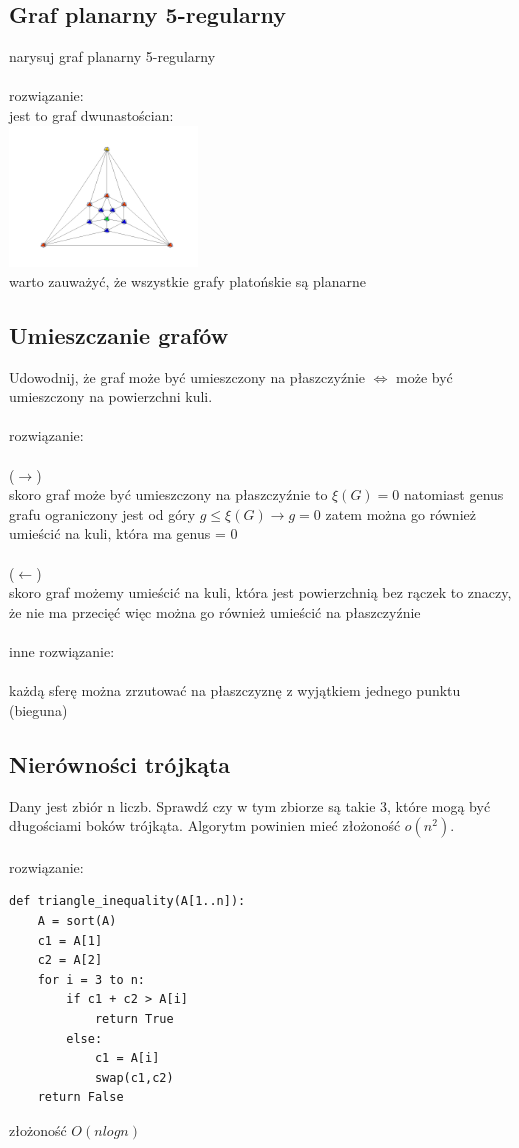 \documentclass{article}
\begin{document}
\subsection*{Graf planarny 5-regularny}
narysuj graf planarny 5-regularny \\\\ rozwiązanie: \\
jest to graf dwunastościan: \\
\includegraphics[width=5cm]{icosahedron} \\
warto zauważyć, że wszystkie grafy platońskie są planarne

\subsection*{Umieszczanie grafów}
Udowodnij, że graf może być umieszczony na płaszczyźnie $\iff$ może być umieszczony na powierzchni kuli. \\\\rozwiązanie:\\\\
($\longrightarrow$)\\
skoro graf może być umieszczony na płaszczyźnie to $\xi(G) = 0$ natomiast genus grafu ograniczony jest od góry $g \leq \xi(G) \rightarrow g = 0$ zatem można go również umieścić na kuli, która ma genus = 0\\\\
($\longleftarrow$) \\
skoro graf możemy umieścić na kuli, która jest powierzchnią bez rączek to znaczy, że nie ma przecięć więc można go również umieścić na płaszczyźnie \\\\
inne rozwiązanie:\\\\
każdą sferę można zrzutować na płaszczyznę z wyjątkiem jednego punktu (bieguna)


\subsection*{Nierówności trójkąta}
Dany jest zbiór n liczb. Sprawdź czy w tym zbiorze są takie 3, które mogą być długościami boków trójkąta. Algorytm powinien mieć złożoność $o(n^2)$. \\\\rozwiązanie:\\
\begin{lstlisting}
def triangle_inequality(A[1..n]):
	A = sort(A)
	c1 = A[1]
	c2 = A[2]
	for i = 3 to n:
		if c1 + c2 > A[i]
			return True
		else:
			c1 = A[i]
			swap(c1,c2)			
	return False

\end{lstlisting}
złożoność $O(nlogn)$
\end{document}
